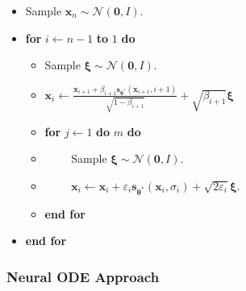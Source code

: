 \documentclass[10pt]{article}
\newcommand{\ve}[1]{\mathbf{#1}}
\newcommand{\ves}[1]{\boldsymbol{#1}}
\newcommand{\mcal}[1]{\mathcal{#1}}
\begin{document}
\begin{itemize}
\begin{itemize}
    \begin{itemize}
      \item[] Sample $\ve{x}_n \sim \mcal{N}(\ve{0},I)$.
      \item[] {\bf for} $i \gets n-1$ {\bf to} $1$ {\bf do}
      \begin{itemize}
        \item[] Sample $\ves{\xi} \sim \mcal{N}(\ve{0}, I)$.
        \item[] $\ve{x}_{i} \gets \frac{\ve{x}_{i+1} + \beta_{i+1} \ve{s}_{\ves{\theta}^*}(\ve{x}_{i+1}, i+1)}{\sqrt{1 - \beta_{i+1}}} + \sqrt{\beta_{i+1}}\ves{\xi}$
        \item[] {\bf for} $j \gets 1$ {\bf do} $m$ {\bf do}        
        \item[] $\qquad$ Sample $\ves{\xi} \sim \mcal{N}(\ve{0}, I)$.
        \item[] $\qquad$ $\ve{x}_i \gets \ve{x}_i + \varepsilon_i \ve{s}_{\ves{\theta}^*}(\ve{x}_{i}, \sigma_{i}) + \sqrt{2 \varepsilon_i} \ves{\xi}$.
        \item[] {\bf end for}
      \end{itemize}
      \item[] {\bf end for}
    \end{itemize}
  \end{itemize}
\end{itemize}

\subsubsection{Neural ODE Approach}


  
\end{document}
